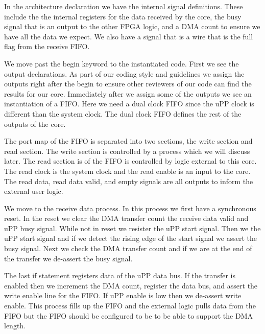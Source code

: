 In the architecture declaration we have the internal signal definitions. These include the the internal registers for the data received by the core, the busy signal that is an output to the other \ac{FPGA} logic, and a \ac{DMA} count to ensure we have all the data we expect. We also have a signal that is a wire that is the full flag from the receive \ac{FIFO}.

We move past the begin keyword to the instantiated code. First we see the output declarations. As part of our coding style and guidelines we assign the outputs right after the begin to ensure other reviewers of our code can find the results for our core. Immediately after we assign some of the outputs we see an instantiation of a \ac{FIFO}. Here we need a dual clock \ac{FIFO} since the \ac{uPP} clock is different than the system clock. The dual clock \ac{FIFO} defines the rest of the outputs of the core. 

The port map of the \ac{FIFO} is separated into two sections, the write section and read section. The write section is controlled by a process which we will discuss later. The read section is of the \ac{FIFO} is controlled by logic external to this core. The read clock is the system clock and the read enable is an input to the core. The read data, read data valid, and empty signals are all outputs to inform the external user logic. 

We move to the receive data process. In this process we first have a synchronous reset. In the reset we clear the \ac{DMA} transfer count the receive data valid and \ac{uPP} busy signal. While not in reset we resister the \ac{uPP} start signal. Then we  the \ac{uPP} start signal and if we detect the rising edge of the start signal we assert the busy signal. Next we check the \ac{DMA} transfer count and if we are at the end of the transfer we de-assert the busy signal. 

The last if statement registers data of the \ac{uPP} data bus. If the transfer is enabled then we increment the \ac{DMA} count, register the data bus, and assert the write enable line for the \ac{FIFO}. If \ac{uPP} enable is low then we de-assert write enable. This process fills up the \ac{FIFO} and the external logic pulls data from the \ac{FIFO} but the \ac{FIFO} should be configured to be to be able to support the \ac{DMA} length. 

